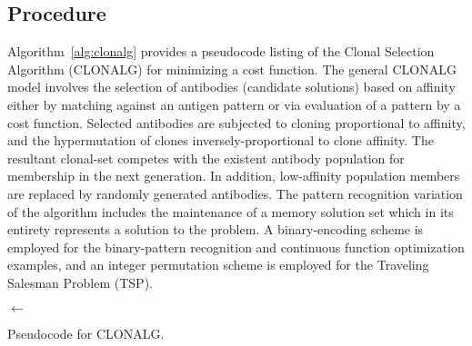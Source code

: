 \subsection{Procedure}
Algorithm~\ref{alg:clonalg} provides a pseudocode listing of the Clonal Selection Algorithm (CLONALG) for minimizing a cost function. 
The general CLONALG model involves the selection of antibodies (candidate solutions) based on affinity either by matching against an antigen pattern or via evaluation of a pattern by a cost function. Selected antibodies are subjected to cloning proportional to affinity, and the hypermutation of clones inversely-proportional to clone affinity. The resultant clonal-set competes with the existent antibody population for membership in the next generation. In addition, low-affinity population members are replaced by randomly generated antibodies. The pattern recognition variation of the algorithm includes the maintenance of a memory solution set which in its entirety represents a solution to the problem. A binary-encoding scheme is employed for the binary-pattern recognition and continuous function optimization examples, and an integer permutation scheme is employed for the Traveling Salesman Problem (TSP).

\begin{algorithm}[ht]
  \SetLine  

  
  \KwIn{\PopSize, \Selectsize, \Length, \RandomCells, \CloneRate, \MutationRate}		
  \KwOut{\Pop}
  
	\Pop $\leftarrow$ \CreateRandomCells{\PopSize, \Length}\;	
	\Return{\Pop}\;
	
	\caption{Pseudocode for CLONALG.}
	\label{alg:clonalg}
\end{algorithm}

